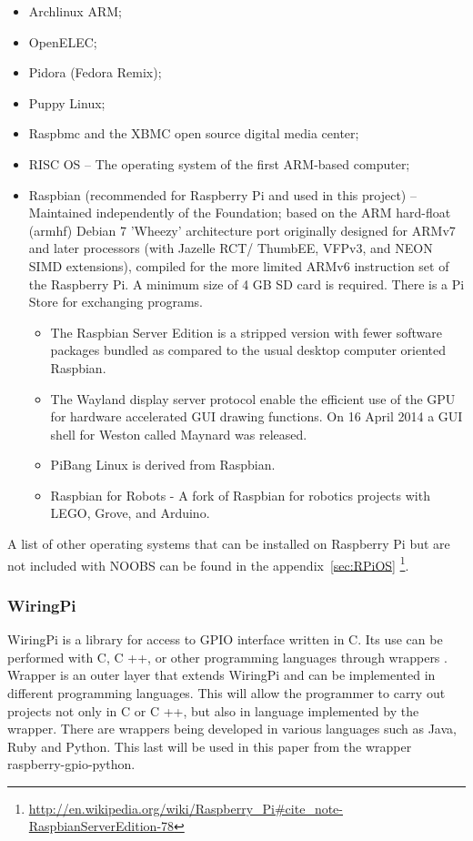 \documentclass{acm_proc_article-sp}
\begin{document}
\begin{itemize}

\item Archlinux ARM;
\item OpenELEC;
\item Pidora (Fedora Remix);
\item Puppy Linux;
\item Raspbmc and the XBMC open source digital media center;
\item RISC OS – The operating system of the first ARM-based computer;
\item Raspbian (recommended for Raspberry Pi and used in this project)\cite{Raspbian} – Maintained independently of the Foundation; based on the ARM hard-float (armhf) Debian 7 'Wheezy' architecture port originally designed for ARMv7 and later processors (with Jazelle RCT/ ThumbEE, VFPv3, and NEON SIMD extensions), compiled for the more limited ARMv6 instruction set of the Raspberry Pi. A minimum size of 4 GB SD card is required. There is a Pi Store for exchanging programs\cite{PiStore}.
\begin{itemize}
\item The Raspbian Server Edition is a stripped version with fewer software packages bundled as compared to the usual desktop computer oriented Raspbian\cite{Yau,Raspbianwheezy}.
\item The Wayland display server protocol enable the efficient use of the GPU for hardware accelerated GUI drawing functions\cite{EbenUpton}. On 16 April 2014 a GUI shell for Weston called Maynard was released.
\item PiBang Linux is derived from Raspbian\cite{Pibanglinux}.
\item Raspbian for Robots\cite{DexterIndustries} - A fork of Raspbian for robotics projects with LEGO, Grove, and Arduino.
\end{itemize}

\end{itemize}

A list of other operating systems that can be installed on Raspberry Pi but are not included with NOOBS can be found in the appendix~\ref{sec:RPiOS} \footnote{\url{http://en.wikipedia.org/wiki/Raspberry_Pi\#cite_note-RaspbianServerEdition-78}}.


\subsubsection{WiringPi}
WiringPi is a library for access to GPIO interface written in C. Its use can be performed with C, C ++, or other programming languages through wrappers \cite{wiring}. Wrapper is an outer layer that extends WiringPi and can be implemented in different programming languages. This will allow the programmer to carry out projects not only in C or C ++, but also in language implemented by the wrapper. There are wrappers being developed in various languages such as Java, Ruby and Python. This last will be used in this paper from the wrapper raspberry-gpio-python.
\end{document}
